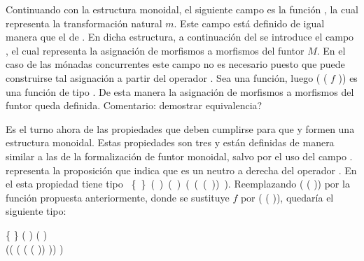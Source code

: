 Continuando con la estructura monoidal, el siguiente campo es la función , la cual representa la transformación natural $m$. Este campo está definido de igual manera que el  de . En dicha estructura, a continuación del  se introduce el campo , el cual representa la asignación de morfismos a morfismos del funtor $\mathit{M}$. En el caso de las mónadas concurrentes este campo no es necesario puesto que puede construirse tal asignación a partir del operador \AgdaField{$\gg=$}. Sea  \AgdaSymbol{:}  \AgdaSymbol{$\rightarrow$}   una función, luego (\AgdaSymbol{$\lambda$}  \AgdaSymbol{$\rightarrow$}  \AgdaField{$\gg=$} (\AgdaSymbol{$\lambda$}  \AgdaSymbol{$\rightarrow$}  $f$ )) es una función de tipo  \AgdaSymbol{$\rightarrow$} . De esta manera la asignación de morfismos a morfismos del funtor queda definida. {\color{red} Comentario: demostrar equivalencia?} 

Es el turno ahora de las propiedades que deben cumplirse para que  y  formen una estructura monoidal. Estas propiedades son tres y están definidas de manera similar a las de la formalización de funtor monoidal, salvo por el uso del campo .  representa la proposición que indica que  es un neutro a derecha del operador . En el   esta propiedad tiene tipo \hbox{\AgdaSymbol{$\forall$} \{ \AgdaSymbol{:} \} \AgdaSymbol{$\rightarrow$} ( \AgdaSymbol{:} ) \AgdaSymbol{$\rightarrow$} ( )  ( (\AgdaSymbol{$\lambda$}  \AgdaSymbol{$\rightarrow$} ( )) )}. Reemplazando  (\AgdaSymbol{$\lambda$}  \AgdaSymbol{$\rightarrow$} ( )) por la función propuesta anteriormente, donde se sustituye $f$ por (\AgdaSymbol{$\lambda$}  \AgdaSymbol{$\rightarrow$} ( )), quedaría el siguiente tipo: 
\begin{center}
\AgdaSymbol{$\forall$} \{ \AgdaSymbol{:} \} \AgdaSymbol{$\rightarrow$} ( \AgdaSymbol{:} ) \AgdaSymbol{$\rightarrow$} ( )   \\ ((\AgdaSymbol{$\lambda$}  \AgdaSymbol{$\rightarrow$}  \AgdaField{$\gg=$} (\AgdaSymbol{$\lambda$}  \AgdaSymbol{$\rightarrow$}  (\AgdaSymbol{$\lambda$}  \AgdaSymbol{$\rightarrow$} ( )) )) )
\end{center}

